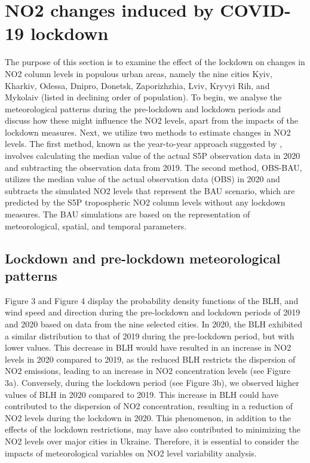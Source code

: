 \section{NO2 changes induced by COVID-19 lockdown} \label{chap3_covid}
The purpose of this section is to examine the effect of the lockdown on changes in NO2 column levels in populous urban areas, namely the nine cities Kyiv, Kharkiv, Odessa, Dnipro, Donetsk, Zaporizhzhia, Lviv, Kryvyi Rih, and Mykolaiv (listed in declining order of population). To begin, we analyse the meteorological patterns during the pre-lockdown and lockdown periods and discuss how these might influence the NO2 levels, apart from the impacts of the lockdown measures. Next, we utilize two methods to estimate changes in NO2 levels. The first method, known as the year-to-year approach suggested by \citep{barre2021estimating}, involves calculating the median value of the actual S5P observation data in 2020 and subtracting the observation data from 2019. The second method, OBS-BAU, utilizes the median value of the actual observation data (OBS) in 2020 and subtracts the simulated NO2 levels that represent the BAU scenario, which are predicted by the S5P tropospheric NO2 column levels without any lockdown measures. The BAU simulations are based on the representation of meteorological, spatial, and temporal parameters. \par
\subsection{Lockdown and pre-lockdown meteorological patterns}
Figure 3 and Figure 4 display the probability density functions of the BLH, and wind speed and direction during the pre-lockdown and lockdown periods of 2019 and 2020 based on data from the nine selected cities. In 2020, the BLH exhibited a similar distribution to that of 2019 during the pre-lockdown period, but with lower values. This decrease in BLH would have resulted in an increase in NO2 levels in 2020 compared to 2019, as the reduced BLH restricts the dispersion of NO2 emissions, leading to an increase in NO2 concentration levels (see Figure 3a). Conversely, during the lockdown period (see Figure 3b), we observed higher values of BLH in 2020 compared to 2019. This increase in BLH could have contributed to the dispersion of NO2 concentration, resulting in a reduction of NO2 levels during the lockdown in 2020. This phenomenon, in addition to the effects of the lockdown restrictions, may have also contributed to minimizing the NO2 levels over major cities in Ukraine. Therefore, it is essential to consider the impacts of meteorological variables on NO2 level variability analysis.\par

